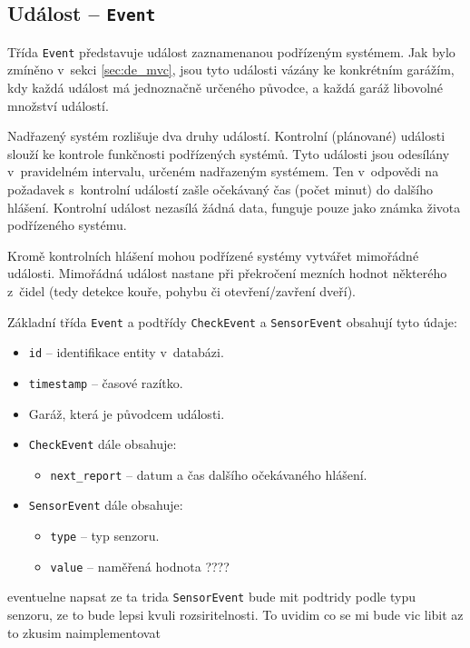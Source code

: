 \subsection{Událost -- \texttt{Event}}

Třída \texttt{Event} představuje událost zaznamenanou podřízeným systémem. Jak bylo zmíněno v~sekci \ref{sec:de_mvc}, jsou tyto události vázány ke konkrétním garážím, kdy každá událost má jednoznačně určeného původce, a každá garáž libovolné množství událostí.

Nadřazený systém rozlišuje dva druhy událostí. Kontrolní (plánované) události slouží ke kontrole funkčnosti podřízených systémů. Tyto události jsou odesílány v~pravidelném intervalu, určeném nadřazeným systémem. Ten v~odpovědi na požadavek s~kontrolní událostí zašle očekávaný čas (počet minut) do dalšího hlášení. Kontrolní událost nezasílá žádná data, funguje pouze jako známka života podřízeného systému.

Kromě kontrolních hlášení mohou podřízené systémy vytvářet mimořádné události. Mimořádná událost nastane při překročení mezních hodnot některého z~čidel (tedy detekce kouře, pohybu či otevření/zavření dveří).

Základní třída \texttt{Event} a podtřídy \texttt{CheckEvent} a \texttt{SensorEvent} obsahují tyto údaje:

\begin{itemize}
    \item \texttt{id} -- identifikace entity v~databázi.
    \item \texttt{timestamp} -- časové razítko.
    \item Garáž, která je původcem události.
    \item \texttt{CheckEvent} dále obsahuje:
        \begin{itemize}
            \item \texttt{next\_report} -- datum a čas dalšího očekávaného hlášení.
        \end{itemize}
    \item \texttt{SensorEvent} dále obsahuje:
        \begin{itemize}
            \item \texttt{type} -- typ senzoru.
            \item \texttt{value} -- naměřená hodnota ????
        \end{itemize}
\end{itemize}

eventuelne napsat ze ta trida \texttt{SensorEvent} bude mit podtridy podle typu senzoru, ze to bude lepsi kvuli rozsiritelnosti. To uvidim co se mi bude vic libit az to zkusim naimplementovat

